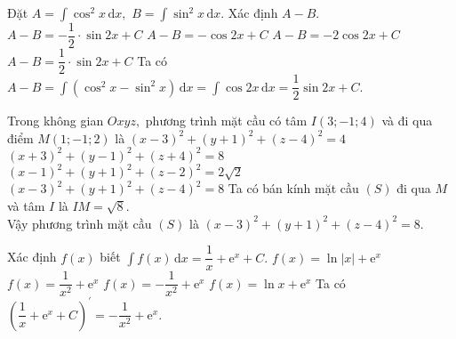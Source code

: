 \begin{ex}%
Đặt $ A=\displaystyle \int \cos^2x\mathrm{\,d}x, $	$ B=\displaystyle \int \sin^2x\mathrm{\,d}x $. Xác định $ A-B. $
	\choice
	{$ A-B=-\dfrac{1}{2}\cdot \sin 2x +C $}
	{$ A-B=-\cos 2x +C $}
	{$ A-B=-2\cos 2x +C $}
	{\True $ A-B=\dfrac{1}{2}\cdot \sin 2x +C $}
	\loigiai
	{Ta có $ A-B=\displaystyle \int \left(\cos^2 x-\sin^2 x\right) \mathrm{\,d}x = \int \cos 2x \mathrm{\,d}x = \dfrac{1}{2}\sin 2x + C.$
	}
\end{ex}
\begin{ex}%
Trong không gian $ Oxyz,  $	phương trình mặt cầu có tâm $ I(3;-1;4) $ và đi qua điểm $ M(1;-1;2) $ là
	\choice
	{$ (x-3)^2+(y+1)^2+(z-4)^2=4 $}
	{$ (x+3)^2+(y-1)^2+(z+4)^2=8 $}
	{$ (x-1)^2+(y+1)^2+(z-2)^2=2\sqrt{2} $}
	{\True $ (x-3)^2+(y+1)^2+(z-4)^2=8 $}
	\loigiai
	{Ta có bán kính mặt cầu $ (S) $ đi qua $ M $ và tâm $ I $ là $ IM = \sqrt{8} $.\\
		Vậy phương trình mặt cầu $ (S) $  là $ (x-3)^2+(y+1)^2+(z-4)^2=8 $.
	}
\end{ex}
\begin{ex}%
Xác định $ f(x) $	 biết $ \displaystyle \int f(x) \mathrm{\,d}x=\dfrac{1}{x}+\mathrm{e}^x+C. $
	\choice
	{$f(x)=\ln\left|x\right|+\mathrm{e}^x $}
	{$f(x)=\dfrac{1}{x^2}+\mathrm{e}^x$}
	{\True$f(x)=-\dfrac{1}{x^2}+\mathrm{e}^x $}
	{$f(x)=\ln x+\mathrm{e}^x $}
	\loigiai
	{Ta có $ \left(\dfrac{1}{x}+\mathrm{e}^x+C\right)^{'}=-\dfrac{1}{x^2}+\mathrm{e}^x. $
	}
\end{ex}
